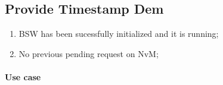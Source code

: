 \subsection{Provide Timestamp Dem}
\begin{enumerate}
	\item BSW has been sucessfully initialized and it is running;
	\item No previous pending request on NvM;
\end{enumerate}

\paragraph{Use case}

